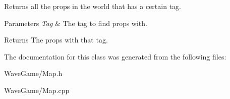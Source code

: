 Returns all the props in the world that has a certain tag. 


\begin{DoxyParams}{Parameters}
{\em Tag} & The tag to find props with.\\
\hline
\end{DoxyParams}
\begin{DoxyReturn}{Returns}
The props with that tag.
\end{DoxyReturn}


The documentation for this class was generated from the following files\+:\begin{DoxyCompactItemize}
\item 
Wave\+Game/Map.\+h\item 
Wave\+Game/Map.\+cpp\end{DoxyCompactItemize}
